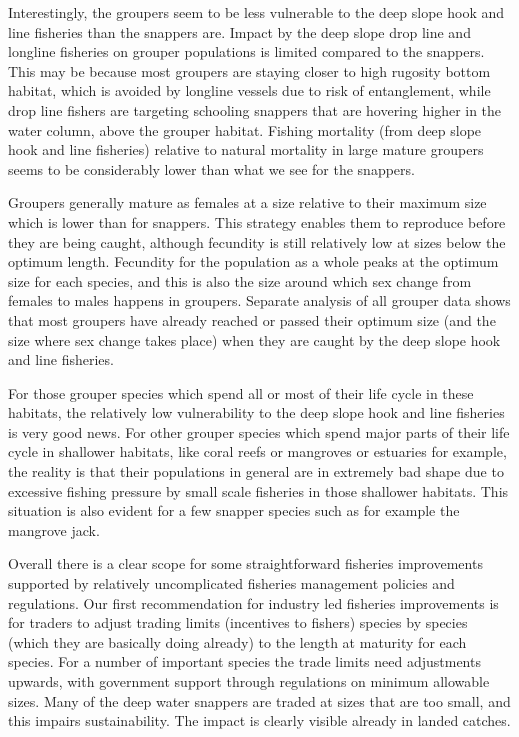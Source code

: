 Interestingly, the groupers seem to be less vulnerable to the deep slope hook and line fisheries than the snappers are. Impact by the deep slope drop line and longline fisheries on grouper populations is limited compared to the snappers. This may be because most groupers are staying closer to high rugosity bottom habitat, which is avoided by longline vessels due to risk of entanglement, while drop line fishers are targeting schooling snappers that are hovering higher in the water column, above the grouper habitat. Fishing mortality (from deep slope hook and line fisheries) relative to natural mortality in large mature groupers seems to be considerably lower than what we see for the snappers.

Groupers generally mature as females at a size relative to their maximum size which is lower than for snappers. This strategy enables them to reproduce before they are being caught, although fecundity is still relatively low at sizes below the optimum length. Fecundity for the population as a whole peaks at the optimum size for each species, and this is also the size around which sex change from females to males happens in groupers. Separate analysis of all grouper data shows that most groupers have already reached or passed their optimum size (and the size where sex change takes place) when they are caught by the deep slope hook and line fisheries.

For those grouper species which spend all or most of their life cycle in these habitats, the relatively low vulnerability to the deep slope hook and line fisheries is very good news. For other grouper species which spend major parts of their life cycle in shallower habitats, like coral reefs or mangroves or estuaries for example, the reality is that their populations in general are in extremely bad shape due to excessive fishing pressure by small scale fisheries in those shallower habitats. This situation is also evident for a few snapper species such as for example the mangrove jack.

Overall there is a clear scope for some straightforward fisheries improvements supported by relatively uncomplicated fisheries management policies and regulations. Our first recommendation for industry led fisheries improvements is for traders to adjust trading limits (incentives to fishers) species by species (which they are basically doing already) to the length at maturity for each species. For a number of important species the trade limits need adjustments upwards, with government support through regulations on minimum allowable sizes. Many of the deep water snappers are traded at sizes that are too small, and this impairs sustainability. The impact is clearly visible already in landed catches.

